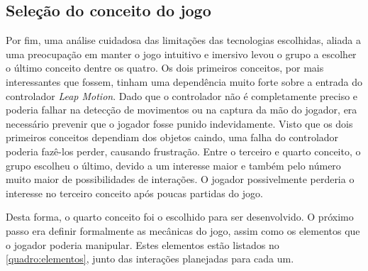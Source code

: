 \subsection{Seleção do conceito do jogo}\label{subsec-selecao-conceito}

Por fim, uma análise cuidadosa das limitações das tecnologias escolhidas, aliada 
a uma preocupação em manter o jogo intuitivo e imersivo levou o grupo a 
escolher o último conceito dentre os quatro. Os dois primeiros conceitos, por 
mais interessantes que fossem, tinham uma dependência muito forte sobre a
entrada do controlador \textit{Leap Motion}. Dado que o controlador não 
é completamente preciso e poderia falhar na detecção de movimentos ou 
na captura da mão do jogador, era necessário prevenir que o jogador fosse
punido indevidamente.
Visto que os dois primeiros conceitos dependiam dos objetos caindo, 
uma falha do controlador poderia fazê-los perder, causando frustração. 
Entre o terceiro e quarto conceito, o grupo escolheu o último, devido a 
um interesse maior e também pelo número muito maior de 
possibilidades de interações. O jogador possivelmente perderia o interesse no terceiro 
conceito após poucas partidas do jogo.

Desta forma, o quarto conceito foi o escolhido para ser desenvolvido. 
O próximo passo era definir formalmente as mecânicas do jogo, 
assim como os elementos que o jogador poderia manipular. Estes 
elementos estão listados no \autoref{quadro:elementos}, junto das 
interações planejadas para cada um.

